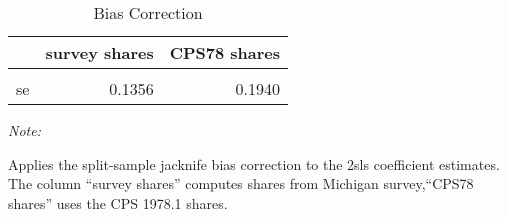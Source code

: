 \begin{table}
\centering
\caption{\label{tab:bias:out:2sls:stage2}Bias Correction}
\centering
\begin{threeparttable}
\begin{tabular}[t]{lrr}
\toprule
  & survey shares & CPS78 shares\\
\midrule
\cellcolor{gray!10}{coeff.} & \cellcolor{gray!10}{0.3753} & \cellcolor{gray!10}{0.5999}\\
se & 0.1356 & 0.1940\\
\bottomrule
\end{tabular}
\begin{tablenotes}
\item \textit{Note: } 
\item Applies the split-sample jacknife bias correction to the 2sls coefficient estimates. The column ``survey shares'' computes shares from Michigan survey,``CPS78 shares'' uses the CPS 1978.1 shares.
\end{tablenotes}
\end{threeparttable}
\end{table}
